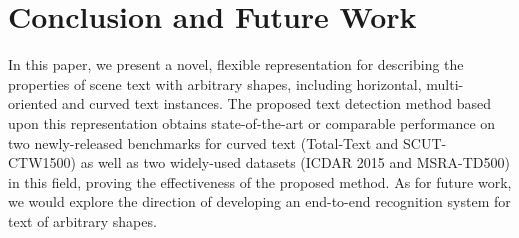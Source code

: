 \documentclass[runningheads]{llncs}
\begin{document}
\section{Conclusion and Future Work}

In this paper, we present a novel, flexible representation for describing the properties of scene text with arbitrary shapes, including horizontal, multi-oriented and curved text instances. The proposed text detection method based upon this representation obtains state-of-the-art or comparable performance on two newly-released benchmarks for curved text (Total-Text and SCUT-CTW1500) as well as two widely-used datasets (ICDAR 2015 and MSRA-TD500) in this field, proving the effectiveness of the proposed method. As for future work, we would explore the direction of developing an end-to-end recognition system for text of arbitrary shapes.









\end{document}
